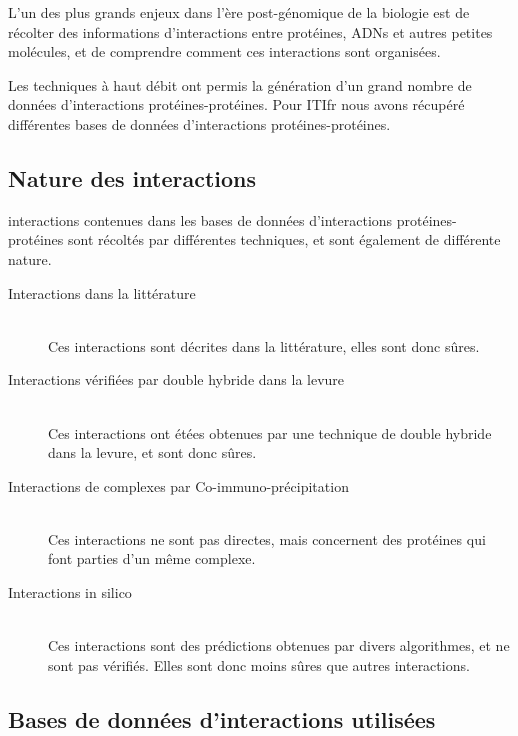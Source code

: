       L'un des plus grands enjeux dans l'ère post-génomique de la biologie est de récolter des informations d'interactions entre protéines, \acsp{ADN} et autres petites molécules, et de comprendre comment ces interactions sont organisées.
      
      Les techniques à haut débit ont permis la génération d'un grand nombre de données d'interactions protéines-protéines.
      Pour \acs{ITIfr} nous avons récupéré différentes bases de données d'interactions protéines-protéines.

    \subsection{\textcolor{mygreen}{Nature des interactions}}
       interactions contenues dans les bases de données d'interactions protéines-protéines sont récoltés par différentes techniques, et sont également de différente nature.
      \begin{description}
        \item[Interactions dans la littérature]                         \hfill \\
          Ces interactions sont décrites dans la littérature, elles sont donc sûres.
        \item[Interactions vérifiées par double hybride dans la levure] \hfill \\
          Ces interactions ont étées obtenues par une technique de double hybride dans la levure, et sont donc sûres.
        \item[Interactions de complexes par Co-immuno-précipitation]    \hfill \\
          Ces interactions ne sont pas directes, mais concernent des protéines qui font parties d'un même complexe.
        \item[Interactions in silico]                                   \hfill \\
          Ces interactions sont des prédictions obtenues par divers algorithmes, et ne sont pas vérifiés.
          Elles sont donc moins sûres que autres interactions. 
      \end{description}

    \subsection{\textcolor{mygreen}{Bases de données d'interactions utilisées}}

